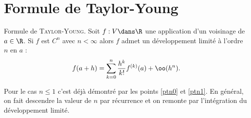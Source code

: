 \documentclass{mybourbaki}
\begin{document}
\section*{Formule de Taylor-Young}

\propt{}Formule de \textsc{Taylor-Young}. Soit $f: V \dans \R$ une application d'un voisinage de $a\in \R$. Si $f$ est $C^n$ avec $n<\infty$ alors $f$ admet un développement limité à l'ordre $n$ en $a$ : \[ f(a+h) = \sum_{k=0}^{n}\frac{h^{k}}{k!}f^{(k)}(a) + \oo(h^{n}). \]

Pour le cas $n\leq 1$ c'est déjà démontré par les points \ref{ptn0} et \ref{ptn1}. En général, on fait descendre la valeur de $n$ par récurrence et on remonte par l'intégration du développement limité.
\end{document}
